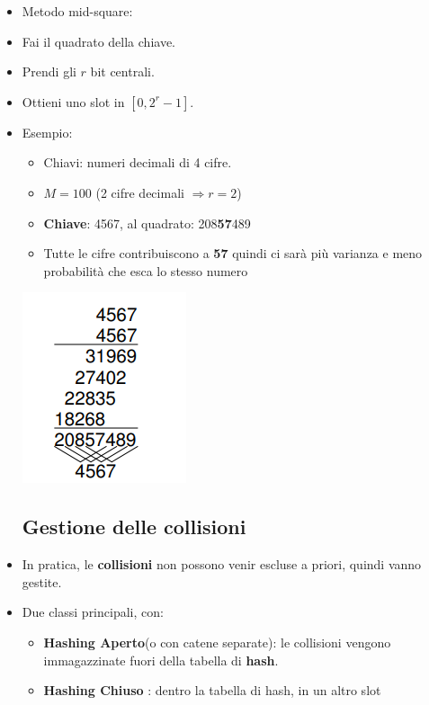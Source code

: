 \begin{itemize}
     \item Metodo mid-square:
    \item Fai il quadrato della chiave.
    \item Prendi gli $r$ bit centrali.
    \item Ottieni uno slot in $\left[0, 2^r - 1\right]$.
    \item Esempio:
    \begin{itemize}
        \item Chiavi: numeri decimali di 4 cifre.
        \item $M = 100$ (2 cifre decimali $\Rightarrow r = 2$)
        \item \textbf{Chiave}: 4567, al quadrato: 208\textbf{57}489
        \item Tutte le cifre contribuiscono a \textbf{57} quindi ci sarà più varianza e meno probabilità che esca lo stesso numero
    \end{itemize}
    \begin{center}
        \includegraphics[scale = 0.8]{Capitoli/HashTable/Esempi/moltipilicazione.png}
    \end{center}

\newpage
    \subsection{Gestione delle collisioni}
    \item In pratica, le \textbf{collisioni} non possono venir escluse a priori,
    quindi vanno gestite.
    \item  Due classi principali, con:
    \begin{itemize}    
        \item \textbf{Hashing Aperto}(o con catene separate): le collisioni vengono immagazzinate fuori della tabella di   \textbf{hash}.
        \item  \textbf{Hashing Chiuso} : dentro la tabella di hash, in un altro slot
    \end{itemize}
    

\end{itemize}
